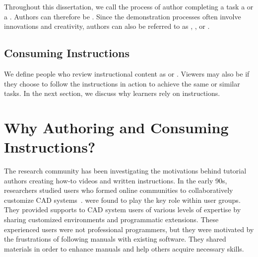 Throughout this dissertation, we call the process of author completing a task a  or a . Authors can therefore be .
%
Since the demonstration processes often involve innovations and creativity, authors can also be referred to as , , or .
%


\subsection{Consuming Instructions}
We define people who review instructional content as  or . Viewers may also be  if they choose to follow the instructions in action to achieve the same or similar tasks. In the next section, we discuss why learners rely on instructions.



\section{Why Authoring and Consuming Instructions?}
\label{background_why}

The research community has been investigating the motivations behind tutorial authors creating how-to videos and written instructions.
%
In the early 90s, researchers studied users who formed online communities to collaboratively customize CAD systems~\cite{Gantt:1992:GGP:142750.142767}.  were found to play the key role within user groups. They provided supports to CAD system users of various levels of expertise by sharing customized environments and programmatic extensions. These experienced users were not professional programmers, but they were motivated by the frustrations of following manuals with existing software. They shared materials in order to enhance manuals and help others acquire necessary skills.

